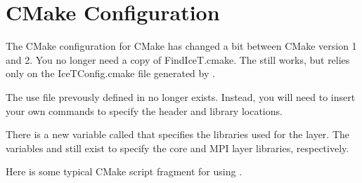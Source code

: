\section{CMake Configuration}
\label{sec:Transitioning:CMake_Configuration}

The CMake configuration for CMake has changed a bit between
CMake version 1 and 2.  You no longer need a copy of
FindIceT.cmake.  The 
still works, but relies only on the
IceTConfig.cmake file generated by \IceT.

The use file prevously defined in  no longer exists.
Instead, you will need to insert your own commands to specify the \IceT
header and library locations.

There is a new variable called  that specifies the
libraries used for the \OpenGL layer.  The variables
 and  still exist to specify
the core and MPI layer libraries, respectively.

Here is some typical CMake script fragment for using \IceT.


